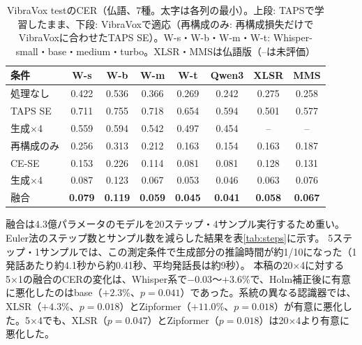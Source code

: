 \documentclass[xelatex,ja=standard,a4paper,twocolumn,10pt]{bxjsarticle}
\makeatletter
\renewcommand{\subsection}{\@startsection{subsection}{2}{\z@}{.7ex plus .2ex}{.3ex}{\normalfont\normalsize\sffamily\bfseries}}
\makeatother
\begin{document}
\begin{table}[t]
  \centering
  \caption{VibraVox testのCER（仏語、7種。太字は各列の最小）。上段: TAPSで学習したまま、下段: VibraVoxで適応（再構成のみ: 再構成損失だけでVibraVoxに合わせたTAPS SE）。W-s・W-b・W-m・W-t: Whisper-small・base・medium・turbo。XLSR・MMSは仏語版（--は未評価）}
  \label{tab:vbx}
  \footnotesize
  \setlength{\tabcolsep}{1.6pt}
  \begin{tabular}{lccccccc}
    \toprule
    条件 & W-s & W-b & W-m & W-t & Qwen3 & XLSR & MMS \\
    \midrule
    処理なし & 0.422 & 0.536 & 0.366 & 0.269 & 0.242 & 0.275 & 0.258 \\
    TAPS SE & 0.711 & 0.755 & 0.718 & 0.654 & 0.594 & 0.501 & 0.577 \\
    生成×4 & 0.559 & 0.594 & 0.542 & 0.497 & 0.454 & -- & -- \\
    \midrule
    再構成のみ & 0.256 & 0.313 & 0.212 & 0.163 & 0.154 & 0.163 & 0.187 \\
    CE-SE & 0.153 & 0.226 & 0.114 & 0.081 & 0.081 & 0.128 & 0.131 \\
    生成×4 & 0.087 & 0.123 & 0.067 & 0.053 & 0.046 & 0.063 & 0.076 \\
    融合 & \textbf{0.079} & \textbf{0.119} & \textbf{0.059} & \textbf{0.045} & \textbf{0.041} & \textbf{0.058} & \textbf{0.067} \\
    \bottomrule
  \end{tabular}
\end{table}

\subsection{計算量}
融合は4.3億パラメータのモデルを20ステップ・4サンプル実行するため重い。Euler法のステップ数とサンプル数を減らした結果を表\ref{tab:steps}に示す。
5ステップ・1サンプルでは、この測定条件で生成部分の推論時間が約1/10になった（1発話あたり約4.1秒から約0.41秒、平均発話長は約9秒）。
本稿の20×4に対する5×1の融合のCERの変化は、Whisper系で$-0.03$〜$+3.6$\%で、Holm補正後に有意に悪化したのはbase（$+2.3$\%、$p=0.041$）であった。系統の異なる認識器では、XLSR（$+4.3$\%、$p=0.018$）とZipformer（$+11.0$\%、$p=0.018$）が有意に悪化した。5×4でも、XLSR（$p=0.047$）とZipformer（$p=0.018$）は20×4より有意に悪化した。
\end{document}
